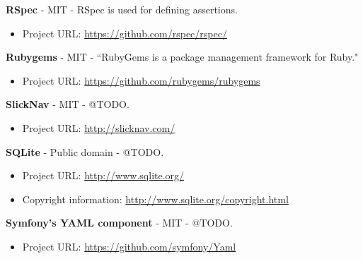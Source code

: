 \textbf{RSpec} - MIT - RSpec is used for defining assertions.

\begin{itemize}
\item Project URL: \url{https://github.com/rspec/rspec/}
\end{itemize}

\textbf{Rubygems} - MIT - ``RubyGems is a package management framework for Ruby."

\begin{itemize}
\item Project URL: \url{https://github.com/rubygems/rubygems}
\end{itemize}

\textbf{SlickNav} - MIT - @TODO.

\begin{itemize}
\item Project URL: \url{http://slicknav.com/}
\end{itemize}

\textbf{SQLite} - Public domain - @TODO.

\begin{itemize}
\item Project URL: \url{http://www.sqlite.org/}
\item Copyright information: \url{http://www.sqlite.org/copyright.html}
\end{itemize}

\textbf{Symfony's YAML component} - MIT - @TODO.

\begin{itemize}
\item Project URL: \url{https://github.com/symfony/Yaml}
\end{itemize}